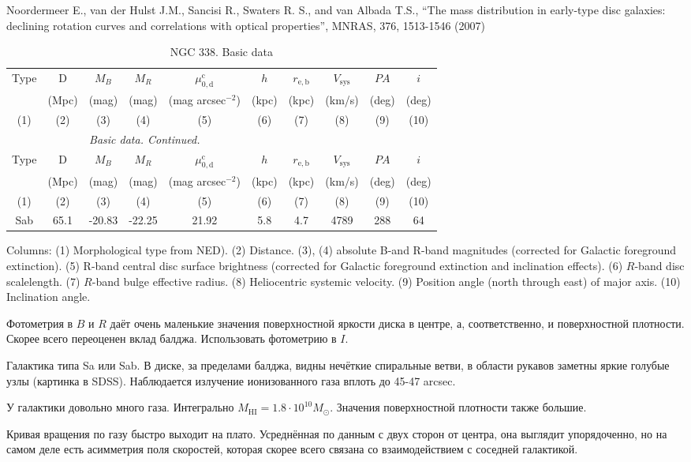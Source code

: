 \documentclass[english,10pt]{article}
\def\mm{\mathrm}
\begin{document}
\bigskip
\noindent
Noordermeer E., van der Hulst J.M., Sancisi R., 
Swaters R. S., and van Albada T.S., 
``The mass distribution in early-type disc galaxies: declining rotation
curves and correlations with optical properties'', 
MNRAS, 376, 1513-1546 (2007)

\begin{longtable}[c]{cccccccccc}
\caption{NGC 338. Basic data}\label{GAL}  \\ 
\hline 
Type & D & $M_B$ & $M_R$ & $\mu_\mm{0,d}^\mm{c}$ & $h$ & $r_\mm{e,b}$
& $V_\mm{sys}$ & $PA$ & $i$ \\ 
& (Mpc) & (mag) & (mag) & (mag arcsec$^{-2}$) & (kpc) & (kpc)
& (km/s) & (deg) & (deg) \\
(1)&(2)&(3)&(4)&(5)&(6)&(7)&(8)&(9)&(10) \\ 
\hline
\endfirsthead 
\hline
\multicolumn{6}{c}{\small\slshape Basic data. 
Continued. } \\ \hline
Type & D & $M_B$ & $M_R$ & $\mu_\mm{0,d}^\mm{c}$ & $h$ & $r_\mm{e,b}$
& $V_\mm{sys}$ & $PA$ & $i$ \\ 
& (Mpc) & (mag) & (mag) & (mag arcsec$^{-2}$) & (kpc) & (kpc)
& (km/s) & (deg) & (deg) \\
(1)&(2)&(3)&(4)&(5)&(6)&(7)&(8)&(9)&(10) \\ 
\hline
\endhead 
\hline
Sab & 65.1 & -20.83 & -22.25 & 21.92 & 5.8 & 4.7 
& 4789 & 288 & 64 \tabularnewline
\hline
\end{longtable}

Columns: 
(1) Morphological type from NED). 
(2) Distance. 
(3), (4) absolute B-and R-band magnitudes 
(corrected for Galactic foreground extinction).
(5) R-band central disc surface brightness 
(corrected for Galactic foreground extinction and inclination effects).
(6) $R$-band disc scalelength.
(7) $R$-band bulge effective radius.
(8) Heliocentric systemic velocity.
(9) Position angle (north through east) of major axis. 
(10) Inclination angle.

\bigskip
\noindent
Фотометрия в $B$ и $R$ даёт очень маленькие значения поверхностной 
яркости диска в центре, а, соответственно, и поверхностной плотности. 
Скорее всего переоценен вклад балджа. Использовать фотометрию в $I$. 

\bigskip
\noindent
Галактика типа Sa или Sab. 
В диске, за пределами балджа, видны нечёткие спиральные ветви, 
в области рукавов заметны яркие голубые узлы (картинка в SDSS). 
Наблюдается излучение ионизованного газа вплоть до 45-47 arcsec.

\bigskip
\noindent
У галактики довольно много газа. Интегрально $M_\mm{HI} = 1.8 \cdot 10^{10} 
M_\odot$. Значения поверхностной плотности также большие.

\bigskip
\noindent
Кривая вращения по газу быстро выходит на плато. Усреднённая по данным 
с двух сторон от центра, она выглядит упорядоченно, но на самом деле 
есть асимметрия поля скоростей, которая скорее всего связана со 
взаимодействием с соседней галактикой.
\end{document}
